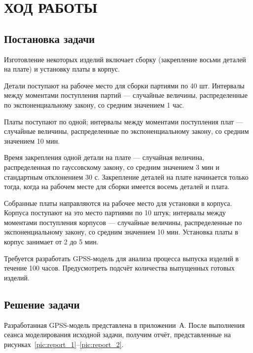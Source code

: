 \section{ХОД РАБОТЫ}

\subsection{Постановка задачи}

Изготовление некоторых изделий включает сборку (закрепление восьми деталей на плате)
и установку платы в корпус.

Детали поступают на рабочее место для сборки партиями по 40 шт.
Интервалы между моментами поступления партий --- случайные величины,
распределенные по экспоненциальному закону, со средним значением 1 час.

Платы поступают по одной; интервалы между моментами поступления плат --- случайные величины,
распределенные по экспоненциальному закону, со средним значением 10 мин.

Время закрепления одной детали на плате --- случайная величина, 
распределенная по гауссовскому закону, со средним значением 3 мин и стандартным отклонением 30 с.
Закрепление деталей на плате начинается только тогда, когда на рабочем месте для сборки
имеется восемь деталей и плата.

Собранные платы направляются на рабочее место для установки в корпуса.
Корпуса поступают на это место партиями по 10 штук; интервалы между моментами поступления корпусов
--- случайные величины, распределенные по экспоненциальному закону, со средним значением 10 мин.
Установка платы в корпус занимает от 2 до 5 мин.

Требуется разработать GPSS-модель для анализа процесса выпуска изделий в течение 100 часов.
Предусмотреть подсчёт количества выпущенных готовых изделий.

\subsection{Решение задачи}

Разработанная GPSS-модель представлена в приложении~А. После выполнения сеанса
моделирования исходной задачи, получим отчёт, представленные на
рисунках~\ref{pic:report_1}--\ref{pic:report_2}.

